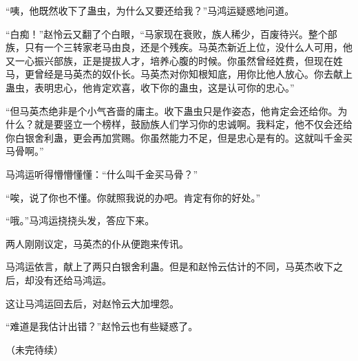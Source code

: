 \begin{this_body}
“咦，他既然收下了蛊虫，为什么又要还给我？”马鸿运疑惑地问道。

“白痴！”赵怜云又翻了个白眼，“马家现在衰败，族人稀少，百废待兴。整个部族，只有一个三转家老马由良，还是个残疾。马英杰新近上位，没什么人可用，他又一心振兴部族，正是提拔人才，培养心腹的时候。你虽然曾经姓费，但现在姓马，更曾经是马英杰的奴仆长。马英杰对你知根知底，用你比他人放心。你去献上蛊虫，表明忠心，他肯定欢喜，收下你的蛊虫，这是认可你的忠心。”

“但马英杰绝非是个小气吝啬的庸主。收下蛊虫只是作姿态，他肯定会还给你。为什么？就是要竖立一个榜样，鼓励族人们学习你的忠诚啊。我料定，他不仅会还给你白银舍利蛊，更会再加赏赐。你虽然能力不足，但是忠心是有的。这就叫千金买马骨啊。”

马鸿运听得懵懵懂懂：“什么叫千金买马骨？”

“唉，说了你也不懂。你就照我说的办吧。肯定有你的好处。”

“哦。”马鸿运挠挠头发，答应下来。

两人刚刚议定，马英杰的仆从便跑来传讯。

马鸿运依言，献上了两只白银舍利蛊。但是和赵怜云估计的不同，马英杰收下之后，却没有还给马鸿运。

这让马鸿运回去后，对赵怜云大加埋怨。

“难道是我估计出错？”赵怜云也有些疑惑了。

（未完待续）

\end{this_body}

